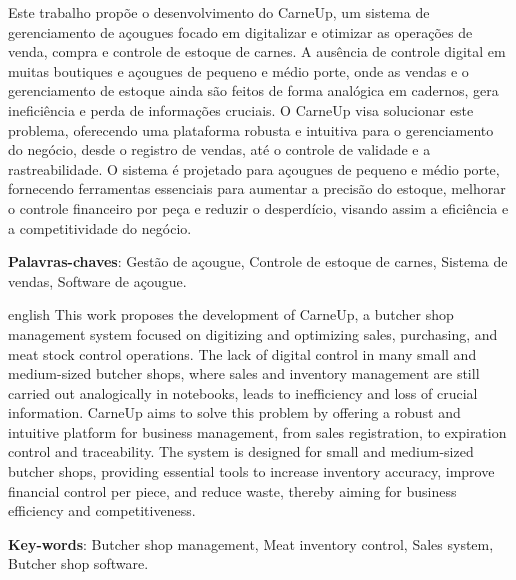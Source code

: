 \documentclass[
	12pt,				%
	openany,			%
	oneside,			%
	a4paper,			%
	english,			%
	french,				%
	spanish,			%
	brazil				%
	]{abntex2}
\begin{document}
\frenchspacing 


\imprimircapa

\imprimirfolhaderosto*


\setlength{\absparsep}{18pt} %
\begin{resumo}
 Este trabalho propõe o desenvolvimento do CarneUp, um sistema de gerenciamento de açougues focado em digitalizar e otimizar as operações de venda, compra e controle de estoque de carnes. A ausência de controle digital em muitas boutiques e açougues de pequeno e médio porte, onde as vendas e o gerenciamento de estoque ainda são feitos de forma analógica em cadernos, gera ineficiência e perda de informações cruciais. O CarneUp visa solucionar este problema, oferecendo uma plataforma robusta e intuitiva para o gerenciamento do negócio, desde o registro de vendas, até o controle de validade e a rastreabilidade. O sistema é projetado para açougues de pequeno e médio porte, fornecendo ferramentas essenciais para aumentar a precisão do estoque, melhorar o controle financeiro por peça e reduzir o desperdício, visando assim a eficiência e a competitividade do negócio. 

 \textbf{Palavras-chaves}: Gestão de açougue, Controle de estoque de carnes, Sistema de vendas, Software de açougue.
\end{resumo}

\begin{resumo}[Abstract]
 \begin{otherlanguage*}{english}
   This work proposes the development of CarneUp, a butcher shop management system focused on digitizing and optimizing sales, purchasing, and meat stock control operations. The lack of digital control in many small and medium-sized butcher shops, where sales and inventory management are still carried out analogically in notebooks, leads to inefficiency and loss of crucial information. CarneUp aims to solve this problem by offering a robust and intuitive platform for business management, from sales registration, to expiration control and traceability. The system is designed for small and medium-sized butcher shops, providing essential tools to increase inventory accuracy, improve financial control per piece, and reduce waste, thereby aiming for business efficiency and competitiveness.

   \vspace{\onelineskip}
 
   \noindent 
   \textbf{Key-words}: Butcher shop management, Meat inventory control, Sales system, Butcher shop software.
 \end{otherlanguage*}
\end{resumo}
\end{document}
